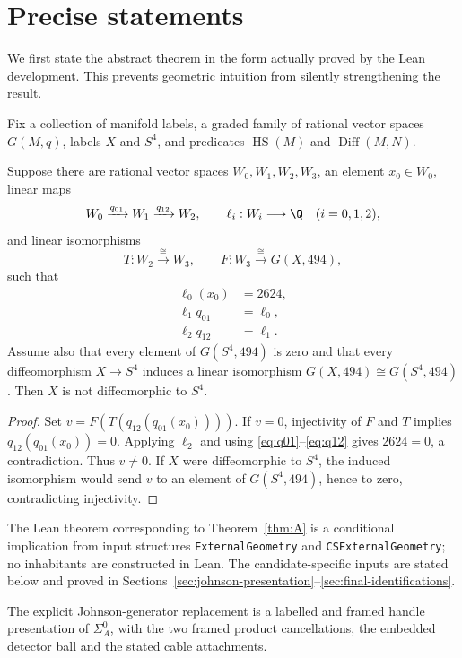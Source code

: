 \section{Precise statements}

We first state the abstract theorem in the form actually proved by the Lean
development.  This prevents geometric intuition from silently strengthening
the result.

Fix a collection of manifold labels, a graded family of rational vector
spaces $G(M,q)$, labels $X$ and $S^4$, and predicates
\(\operatorname{HS}(M)\) and \(\operatorname{Diff}(M,N)\).

\begin{theorem}\label{thm:A}
Suppose there are rational vector spaces $W_0,W_1,W_2,W_3$, an element
$x_0\in W_0$, linear maps
\[
W_0\xrightarrow{q_{01}}W_1\xrightarrow{q_{12}}W_2,
\qquad
\ell_i:W_i\longrightarrow\Q\quad (i=0,1,2),
\]
and linear isomorphisms
\[
T:W_2\xrightarrow{\cong}W_3,
\qquad
F:W_3\xrightarrow{\cong}G(X,494),
\]
such that
\begin{align}
\ell_0(x_0)&=2624,\label{eq:value}\\
\ell_1q_{01}&=\ell_0,\label{eq:q01}\\
\ell_2q_{12}&=\ell_1.\label{eq:q12}
\end{align}
Assume also that every element of $G(S^4,494)$ is zero and that every
diffeomorphism $X\to S^4$ induces a linear isomorphism
\(G(X,494)\cong G(S^4,494)\).  Then $X$ is not diffeomorphic to $S^4$.
\end{theorem}

\begin{proof}
Set $v=F(T(q_{12}(q_{01}(x_0))))$.  If $v=0$, injectivity of $F$ and $T$
implies $q_{12}(q_{01}(x_0))=0$.  Applying $\ell_2$ and using
\eqref{eq:q01}--\eqref{eq:q12} gives $2624=0$, a contradiction.  Thus
$v\ne0$.  If $X$ were diffeomorphic to $S^4$, the induced isomorphism would
send $v$ to an element of $G(S^4,494)$, hence to zero, contradicting
injectivity.
\end{proof}

The Lean theorem corresponding to Theorem~\ref{thm:A} is a conditional
implication from input structures \texttt{ExternalGeometry} and
\texttt{CSExternalGeometry}; no inhabitants are constructed in Lean.
The candidate-specific inputs are stated below and proved in
Sections~\ref{sec:johnson-presentation}--\ref{sec:final-identifications}.

\begin{hypothesis}\label{hyp:P0}
The explicit Johnson-generator replacement is a labelled and framed handle
presentation of $\Sigma_A^0$, with the two framed product cancellations, the
embedded detector ball and the stated cable attachments.
\end{hypothesis}

